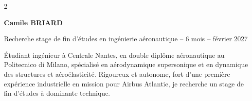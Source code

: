 \begin{paracol}{2}

  \RaggedRight
  {\begin{center}\huge\bfseries\color{accent}Camile BRIARD\end{center}}\par

  \begin{center}\end{center}
  \vspace{5pt}
  

  \switchcolumn

  {\Large\bfseries\itshape\color{accent} \begin{center}Recherche stage de fin d’études en ingénierie aéronautique -- 6 mois -- février 2027 \end{center}}\par
  \vspace{7pt}

  {\small
  Étudiant ingénieur à Centrale Nantes, en double diplôme aéronautique au Politecnico di Milano, 
  spécialisé en aérodynamique supersonique et en dynamique des structures et aéroélasticité. 
  Rigoureux et autonome, fort d'une première expérience industrielle en mission pour Airbus Atlantic, 
  je recherche un stage de fin d’études à dominante technique.}
  \vspace{6pt}


  
  
  

\end{paracol}

